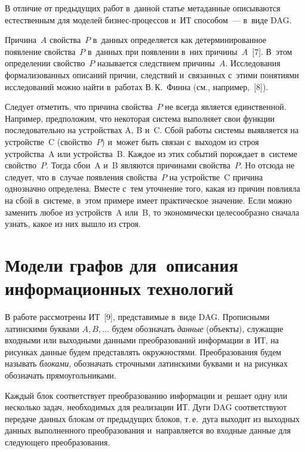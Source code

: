 \begin{multicols}{2}
  В отличие от предыдущих работ в~данной статье метаданные описываются 
естественным для моделей 
  бизнес-процессов и~ИТ способом~--- в~виде DAG. 
  
  Причина~$A$ свойства~$P$ в~данных определяется как детерминированное 
появление свойства~$P$ в~данных при появлении в~них причины~$A$~[7]. 
В~этом определении свойство~$P$ называется следствием причины~$A$. 
Исследования формализованных описаний причин, следствий и~связанных 
с~этими понятиями исследований можно найти в~работах В.\,К.~Финна (см., 
например,~[8]). 
  
  Следует отметить, что причина свойства~$P$ не всегда является единственной. 
Например, предположим, что некоторая система выполняет свои функции 
последовательно на устройствах A, B и~C. Сбой работы системы выявляется на 
устройстве~C (свойство~$P$) и~может быть связан с~выходом из строя 
устройства~A или устройства~B. Каждое из этих событий порождает в~системе 
свойство~$P$. Тогда сбои~A и~B являются причинами свойства~$P$. Но 
отсюда не следует, что в~случае появления свойства~$P$ на устройстве~C 
причина однозначно определена. Вместе с~тем уточнение того, какая из причин 
повлияла на сбой в~системе, в~этом примере имеет практическое значение. Если 
можно заменить любое из устройств~A или~B, то экономически целесообразно 
сначала узнать, какое из них вышло из строя. 

\vspace*{-6pt}
  
  \section{Модели графов для~описания информационных технологий} 
  
  \vspace*{-3pt}
  
  В работе рассмотрены ИТ~[9], представимые в~виде DAG. Прописными 
латинскими буквами $A, B,\ldots$ будем обозначать \textit{данные} (объекты), 
служащие входными или выходными данными преобразований информации 
в~ИТ, на рисунках данные будем представлять окружностями. Преобразования 
будем называть \textit{блоками}, обозначать строчными латинскими буквами и~на 
рисунках обозначать прямоугольниками. 
  
  Каждый блок соответствует преобразованию информации и~решает одну или 
несколько задач, необходимых для реализации ИТ. Дуги DAG соответствуют 
передаче данных блокам от предыдущих блоков, т.\,е.\ дуга выходит из выходных 
данных выполненного преобразования и~направляется во входные данные для 
следующего преобразования. 
  

\end{multicols}
